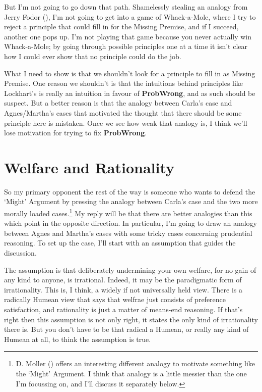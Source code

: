 \documentclass[
  10pt,
  letterpaper,
  DIV=11,
  numbers=noendperiod,
  twoside]{scrartcl}
\begin{document}
But I'm not going to go down that path. Shamelessly stealing an analogy
from Jerry Fodor (), I'm not going to get
into a game of Whack-a-Mole, where I try to reject a principle that
could fill in for the Missing Premise, and if I succeed, another one
pops up. I'm not playing that game because you never actually win
Whack-a-Mole; by going through possible principles one at a time it
isn't clear how I could ever show that no principle could do the job.

What I need to show is that we shouldn't look for a principle to fill in
as Missing Premise. One reason we shouldn't is that the intuitions
behind principles like Lockhart's is really an intuition in favour of
\textbf{ProbWrong}, and as such should be suspect. But a better reason
is that the analogy between Carla's case and Agnes/Martha's cases that
motivated the thought that there should be some principle here is
mistaken. Once we see how weak that analogy is, I think we'll lose
motivation for trying to fix \textbf{ProbWrong}.

\section{Welfare and Rationality}\label{welfareandrationality}

So my primary opponent the rest of the way is someone who wants to
defend the `Might' Argument by pressing the analogy between Carla's case
and the two more morally loaded cases.\footnote{D. Moller
  () offers an interesting different
  analogy to motivate something like the `Might' Argument. I think that
  analogy is a little messier than the one I'm focussing on, and I'll
  discuss it separately below.} My reply will be that there are better
analogies than this which point in the opposite direction. In
particular, I'm going to draw an analogy between Agnes and Martha's
cases with some tricky cases concerning prudential reasoning. To set up
the case, I'll start with an assumption that guides the discussion.

The assumption is that deliberately undermining your own welfare, for no
gain of any kind to anyone, is irrational. Indeed, it may be the
paradigmatic form of irrationality. This is, I think, a widely if not
universally held view. There is a radically Humean view that says that
welfrae just consists of preference satisfaction, and rationality is
just a matter of means-end reasoning. If that's right then this
assumption is not only right, it states the only kind of irrationality
there is. But you don't have to be that radical a Humean, or really any
kind of Humean at all, to think the assumption is true.
\end{document}
